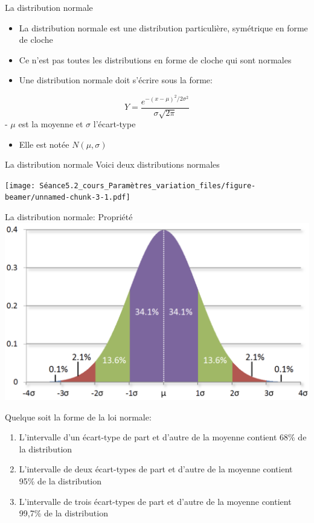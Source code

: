 \documentclass[
  ignorenonframetext,
]{beamer}
\providecommand{\tightlist}{%
  \setlength{\itemsep}{0pt}\setlength{\parskip}{0pt}}
\begin{document}
\begin{frame}{La distribution normale}
\protect\hypertarget{la-distribution-normale}{}
\begin{itemize}
\tightlist
\item
  La distribution normale est une distribution particulière, symétrique
  en forme de cloche
\item
  Ce n'est pas toutes les distributions en forme de cloche qui sont
  normales
\item
  Une distribution normale doit s'écrire sous la forme:
\end{itemize}

\[Y = \frac{e^{-(x - \mu)^2/2\sigma^2}}{\sigma\sqrt{2\pi}}\] - \(\mu\)
est la moyenne et \(\sigma\) l'écart-type

\begin{itemize}
\tightlist
\item
  Elle est notée \(N(\mu, \sigma)\)
\end{itemize}
\end{frame}

\begin{frame}{La distribution normale}
\protect\hypertarget{la-distribution-normale-1}{}
Voici deux distributions normales

\texttt{[image: Séance5.2\_cours\_Paramètres\_variation\_files/figure-beamer/unnamed-chunk-3-1.pdf]}
\end{frame}

\begin{frame}{La distribution normale: Propriété}
\protect\hypertarget{la-distribution-normale-propriuxe9tuxe9}{}
\includegraphics{../Images/Courbe_normale.png}

Quelque soit la forme de la loi normale:

\begin{enumerate}
\item
  L'intervalle d'un écart-type de part et d'autre de la moyenne contient
  68\% de la distribution
\item
  L'intervalle de deux écart-types de part et d'autre de la moyenne
  contient 95\% de la distribution
\item
  L'intervalle de trois écart-types de part et d'autre de la moyenne
  contient 99,7\% de la distribution
\end{enumerate}
\end{frame}
\end{document}
